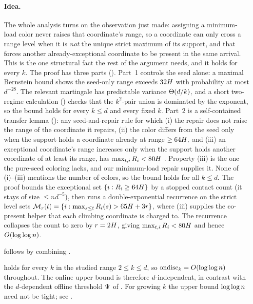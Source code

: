 \paragraph{Idea.}
The whole analysis turns on the observation just made: assigning a minimum-load color never raises that coordinate's range,
so a coordinate can only cross a range level when it is \emph{not} the unique strict maximum of its support, and that forces
another already-exceptional coordinate to be present in the same arrival. This is the one structural fact the rest of the
argument needs, and it holds for every $k$. The proof has three parts (). Part~1 controls the
seed alone: a maximal Bernstein bound shows the seed-only range exceeds $32H$ with probability at most $d^{-28}$. The
relevant martingale has predictable variance $\Theta(d/k)$, and a short two-regime calculation ()
checks that the $k^2$-pair union is dominated by the exponent, so the bound holds for every $k\le d$ and every fixed $k$.
Part~2 is a self-contained transfer lemma (): any seed-and-repair rule for which (i) the repair does not
raise the range of the coordinate it repairs, (ii) the color differs from the seed only when the support holds a coordinate
already at range $\ge 64H$, and (iii) an exceptional coordinate's range increases only when the support holds another
coordinate of at least its range, has $\max_{t,i}R_i<80H$ \whp. Property (iii) is the one the pure-seed coloring
lacks, and our minimum-load repair supplies it. None of (i)--(iii) mentions the number of colors, so the bound holds for all
$k\le d$. The proof bounds the exceptional set $\{i:R_i\ge 64H\}$ by a stopped contact count
(it stays of size $\le n d^{-5}$), then runs a double-exponential recurrence on the strict level sets
$\mathcal M_r(t)=\{i:\max_{s\le t}R_i(s)>65H+3r\}$, where (iii) supplies the co-present helper that each climbing
coordinate is charged to. The recurrence
collapses the count to zero by $r=2H$, giving $\max_{t,i}R_i<80H$ and hence $O(\log\log n)$.

\medskip
{} follows by combining .

\begin{remark}\label{rem:online-upper-allk}
 holds for every $k$ in the studied range $2\le k\le d$, so $\mathrm{ondisc}_k=O(\log\log n)$ throughout. The
online upper bound is therefore $d$-independent, in contrast with the $d$-dependent offline threshold $\Psi$ of
. For growing $k$ the upper bound $\log\log n$ need not be tight; see .
\end{remark}
